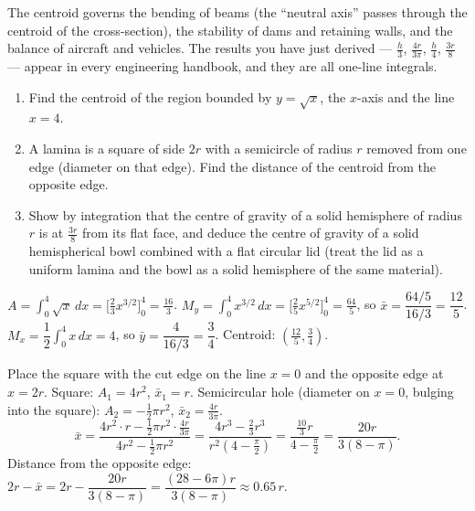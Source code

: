 \documentclass[11pt]{article}
\begin{document}
\begin{savaistu}
The centroid governs the bending of beams (the ``neutral axis'' passes through the centroid of the cross-section), the stability of dams and retaining walls, and the balance of aircraft and vehicles. The results you have just derived — $\tfrac{h}{3}$, $\tfrac{4r}{3\pi}$, $\tfrac{h}{4}$, $\tfrac{3r}{8}$ — appear in every engineering handbook, and they are all one-line integrals.
\end{savaistu}

\begin{exercice}[Practice]
\begin{enumerate}
\item Find the centroid of the region bounded by $y=\sqrt{x}$, the $x$-axis and the line $x=4$.
\item A lamina is a square of side $2r$ with a semicircle of radius $r$ removed from one edge (diameter on that edge). Find the distance of the centroid from the opposite edge.
\item Show by integration that the centre of gravity of a solid hemisphere of radius $r$ is at $\tfrac{3r}{8}$ from its flat face, and deduce the centre of gravity of a solid hemispherical bowl combined with a flat circular lid (treat the lid as a uniform lamina and the bowl as a solid hemisphere of the same material).
\end{enumerate}
\end{exercice}

\begin{corrige}[Exercise 1]
$A=\displaystyle\int_0^4 \sqrt{x}\,dx=\Big[\tfrac23 x^{3/2}\Big]_0^4=\tfrac{16}{3}$.
$M_y=\displaystyle\int_0^4 x^{3/2}\,dx=\Big[\tfrac25 x^{5/2}\Big]_0^4=\tfrac{64}{5}$, so $\bar{x}=\dfrac{64/5}{16/3}=\dfrac{12}{5}$.
$M_x=\dfrac12\displaystyle\int_0^4 x\,dx=4$, so $\bar{y}=\dfrac{4}{16/3}=\dfrac34$. Centroid: $\left(\tfrac{12}{5},\tfrac34\right)$.
\end{corrige}

\begin{corrige}[Exercise 2]
Place the square with the cut edge on the line $x=0$ and the opposite edge at $x=2r$. Square: $A_1=4r^2$, $\bar{x}_1=r$. Semicircular hole (diameter on $x=0$, bulging into the square): $A_2=-\tfrac12\pi r^2$, $\bar{x}_2=\tfrac{4r}{3\pi}$.
\[ \bar{x}=\frac{4r^2\cdot r-\tfrac12\pi r^2\cdot\tfrac{4r}{3\pi}}{4r^2-\tfrac12\pi r^2}
=\frac{4r^3-\tfrac23 r^3}{r^2\left(4-\tfrac{\pi}{2}\right)}
=\frac{\tfrac{10}{3}r}{4-\tfrac{\pi}{2}}=\frac{20r}{3(8-\pi)}. \]
Distance from the opposite edge: $2r-\bar{x}=2r-\dfrac{20r}{3(8-\pi)}=\dfrac{(28-6\pi)r}{3(8-\pi)}\approx 0.65\,r$.
\end{corrige}
\end{document}
